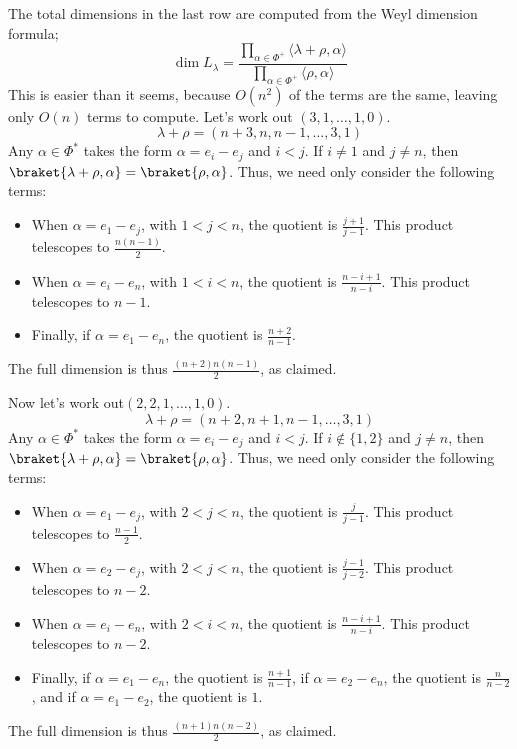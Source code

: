\documentclass[11pt, headheight=30pt]{scrartcl}
\begin{document}
The total dimensions in the last row are computed from the Weyl dimension formula;
\[
    \dim L_\lambda = \frac{\prod_{\alpha\in\Phi^+} \langle \lambda + \rho, \alpha\rangle}{\prod_{\alpha\in\Phi^+} \langle \rho, \alpha\rangle}    
\]
This is easier than it seems, because $O(n^2)$ of the terms are the same, leaving only $O(n)$ terms to compute. Let's work out $(3,1,\dots,1,0)$.
\[
    \lambda + \rho = (n + 3, n, n - 1,\dots, 3, 1)
\]
Any $\alpha \in \Phi^*$ takes the form $\alpha = e_i - e_j$ and $i < j$. If $i \neq 1$ and $j \neq n$, then $\braket{\lambda + \rho, \alpha} = \braket{\rho, \alpha}$. Thus, we need only consider the following terms:
\begin{itemize}
    \item When $\alpha = e_1 - e_j$, with $1 < j < n$, the quotient is $\frac{j + 1}{j-1}$. This product telescopes to $\frac{n(n-1)}{2}$.
    \item When $\alpha = e_i - e_n$, with $1 < i < n$, the quotient is $\frac{n-i +1}{n-i}$. This product telescopes to $n-1$.
    \item Finally, if $\alpha = e_1 - e_n$, the quotient is $\frac{n+2}{n-1}$.
\end{itemize}
The full dimension is thus $\frac{(n+2)n(n-1)}{2}$, as claimed.

Now let's work out$(2,2,1,\dots,1,0)$.
\[
    \lambda + \rho = (n + 2, n + 1, n - 1,\dots, 3, 1)
\]
Any $\alpha \in \Phi^*$ takes the form $\alpha = e_i - e_j$ and $i < j$. If $i \notin \{1,2\}$ and $j \neq n$, then $\braket{\lambda + \rho, \alpha} = \braket{\rho, \alpha}$. Thus, we need only consider the following terms:
\begin{itemize}
    \item When $\alpha = e_1 - e_j$, with $2 < j < n$, the quotient is $\frac{j}{j-1}$. This product telescopes to $\frac{n-1}{2}$.
    \item When $\alpha = e_2 - e_j$, with $2 < j < n$, the quotient is $\frac{j-1}{j-2}$. This product telescopes to $n-2$.
    \item When $\alpha = e_i - e_n$, with $2 < i < n$, the quotient is $\frac{n-i +1}{n-i}$. This product telescopes to $n-2$.
    \item Finally, if $\alpha = e_1 - e_n$, the quotient is $\frac{n+1}{n-1}$, if $\alpha = e_2 - e_n$, the quotient is $\frac{n}{n-2}$, and if $\alpha = e_1 - e_2$, the quotient is $1$.
\end{itemize}
The full dimension is thus $\frac{(n+1)n(n-2)}{2}$, as claimed.
\end{document}
